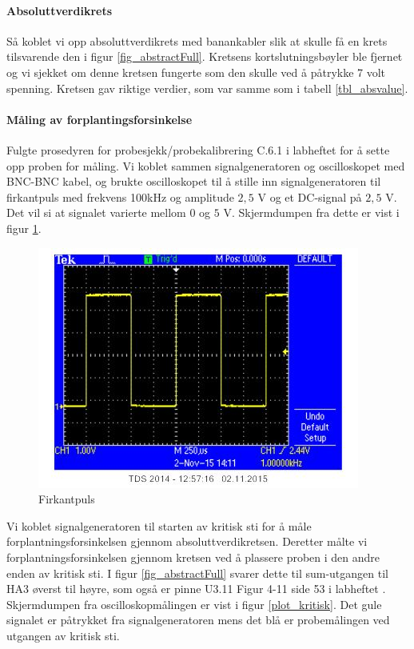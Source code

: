 \documentclass[11pt, a4paper, norwegian]{article}
\begin{document}
\paragraph{Absoluttverdikrets}
Så koblet vi opp absoluttverdikrets med banankabler slik at skulle få en krets tilsvarende den i figur \ref{fig_abstractFull}. Kretsens kortslutningsbøyler ble fjernet og vi sjekket om denne kretsen fungerte som den skulle ved å påtrykke 7 volt spenning. Kretsen gav riktige verdier, som var samme som i tabell \ref{tbl_absvalue}. 

\paragraph{Måling av forplantingsforsinkelse}
Fulgte prosedyren for probesjekk/probekalibrering C.6.1 i labheftet \cite{labhefte} for å sette opp proben for måling. Vi koblet sammen signalgeneratoren og oscilloskopet med BNC-BNC kabel, og brukte oscilloskopet til å stille inn signalgeneratoren til firkantpuls med frekvens 100kHz og amplitude $2,5$ V  og et DC-signal på $2,5$ V. Det vil si at signalet varierte mellom $0$ og $5$ V. Skjermdumpen fra dette er vist i figur \ref{plot_square}.

\begin{figure}[h]
  \caption{Firkantpuls}
  \label{plot_square}
  \centerline{\includegraphics[width=\textwidth]{osc_square.jpg}}
\end{figure}

Vi koblet signalgeneratoren til starten av kritisk sti for å måle forplantningsforsinkelsen gjennom absoluttverdikretsen. Deretter målte vi forplantningsforsinkelsen gjennom kretsen ved å plassere proben i den andre enden av kritisk sti. I figur \ref{fig_abstractFull} svarer dette til sum-utgangen til HA3 øverst til høyre, som også er pinne U3.11 Figur 4-11 side 53 i labheftet \cite{labhefte}. 
Skjermdumpen fra oscilloskopmålingen er vist i figur \ref{plot_kritisk}. Det gule signalet er påtrykket fra signalgeneratoren mens det blå er probemålingen ved utgangen av kritisk sti. 
\end{document}
